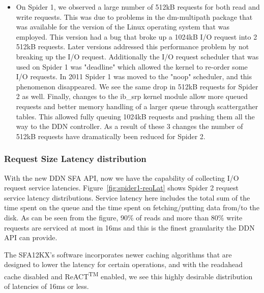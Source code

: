 \begin{itemize}
\item   On Spider 1, we observed a large number of 512kB requests for both read
and write requests. This was due to problems in the dm-multipath \cite{mpath} 
package that was available for the version of the Linux operating system that was 
employed. This version had a bug that broke up a 1024kB I/O request into 2 
512kB requests. Later versions addressed this performance problem by not breaking 
up the I/O request. Additionally the I/O request scheduler that was used on 
Spider 1 was "deadline" which allowed the kernel to re-order some I/O requests. 
In 2011 Spider 1 was moved to the "noop" scheduler, and this phenomenon 
disappeared. We see the same drop in 512kB requests for Spider 2 as well. Finally, 
changes to the ib\_srp kernel module allow more queued requests and better memory 
handling of a larger queue through scatter\/gather tables. This allowed fully 
queuing 1024kB requests and pushing them all the way to the DDN controller. As 
a result of these 3 changes the number of 512kB requests have dramatically been 
reduced for Spider 2.

\end{itemize}

\subsubsection{Request Size Latency distribution}

With the new DDN SFA API, now we have the capability of collecting I/O request
service latencies. Figure~\ref{fig:spider1-reqLat} shows Spider 2 request service
latency distributions. Service latency here includes the total sum of the time
spent on the queue and the time spent on fetching/putting data from/to the
disk. As can be seen from the figure, 90\% of reads and more than 80\% write
requests are serviced at most in 16ms and this is the finest granularity the
DDN API can provide. 

The SFA12KX's software incorporates newer caching algorithms that are designed to 
lower the latency for certain operations, and with the readahead cache disabled 
and ReACT\textsuperscript{TM} enabled, we see this highly desirable distribution 
of latencies of 16ms or less.

